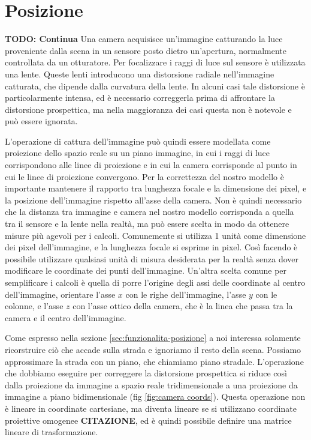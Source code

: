 \chapter{Posizione}
\label{sec:posizione}

\textbf{TODO: Continua}
Una camera acquisisce un'immagine catturando la luce proveniente dalla scena in un sensore posto dietro un'apertura, normalmente controllata da un otturatore.
Per focalizzare i raggi di luce sul sensore è utilizzata una lente.
Queste lenti introducono una distorsione radiale nell'immagine catturata, che dipende dalla curvatura della lente.
In alcuni casi tale distorsione è particolarmente intensa, ed è necessario correggerla prima di affrontare la distorsione prospettica, ma nella maggioranza dei casi questa non è notevole e può essere ignorata.

L'operazione di cattura dell'immagine può quindi essere modellata come proiezione dello spazio reale su un piano immagine, in cui i raggi di luce corrispondono alle linee di proiezione e in cui la camera corrisponde al punto in cui le linee di proiezione convergono.
Per la correttezza del nostro modello è importante mantenere il rapporto tra lunghezza focale e la dimensione dei pixel, e la posizione dell'immagine rispetto all'asse della camera.
Non è quindi necessario che la distanza tra immagine e camera nel nostro modello corrisponda a quella tra il sensore e la lente nella realtà, ma può essere scelta in modo da ottenere misure più agevoli per i calcoli.
Comunemente si utilizza 1 unità come dimensione dei pixel dell'immagine, e la lunghezza focale si esprime in pixel.
Così facendo è possibile utilizzare qualsiasi unità di misura desiderata per la realtà senza dover modificare le coordinate dei punti dell'immagine.
Un'altra scelta comune per semplificare i calcoli è quella di porre l'origine degli assi delle coordinate al centro dell'immagine, orientare l'asse $x$ con le righe dell'immagine, l'asse $y$ con le colonne, e l'asse $z$ con l'asse ottico della camera, che è la linea che passa tra la camera e il centro dell'immagine.

Come espresso nella sezione \ref{sec:funzionalita-posizione} a noi interessa solamente ricorstruire ciò che accade sulla strada e ignoriamo il resto della scena.
Possiamo approssimare la strada con un piano, che chiamiamo piano stradale.
L'operazione che dobbiamo eseguire per correggere la distorsione prospettica si riduce così dalla proiezione da immagine a spazio reale tridimensionale a una proiezione da immagine a piano bidimensionale (fig \ref{fig:camera coords}).
Questa operazione non è lineare in coordinate cartesiane, ma diventa lineare se si utilizzano coordinate proiettive omogenee \textbf{CITAZIONE}, ed è quindi possibile definire una matrice lineare di trasformazione.

